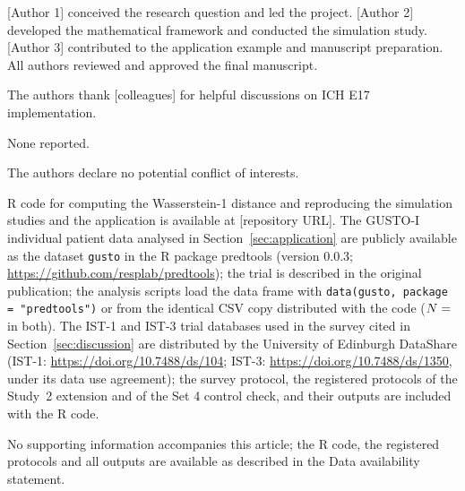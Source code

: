 \documentclass[AMA,Times1COL]{WileyNJDv5}
\begin{document}


[Author 1] conceived the research question and led the project. [Author 2] developed the mathematical framework and conducted the simulation study. [Author 3] contributed to the application example and manuscript preparation. All authors reviewed and approved the final manuscript.


The authors thank [colleagues] for helpful discussions on ICH E17 implementation.


None reported.


The authors declare no potential conflict of interests.


R code for computing the Wasserstein-1 distance and reproducing the simulation studies and the application is available at [repository URL]. The GUSTO-I individual patient data analysed in Section~\ref{sec:application} are publicly available as the dataset \texttt{gusto} in the R package predtools (version 0.0.3; \url{https://github.com/resplab/predtools}); the trial is described in the original publication;\cite{gusto1993} the analysis scripts load the data frame with \texttt{data(gusto, package = "predtools")} or from the identical CSV copy distributed with the code ($N = \numval{gustoN}$ in both). The IST-1 and IST-3 trial databases used in the survey cited in Section~\ref{sec:discussion} are distributed by the University of Edinburgh DataShare (IST-1: \url{https://doi.org/10.7488/ds/104}; IST-3: \url{https://doi.org/10.7488/ds/1350}, under its data use agreement); the survey protocol, the registered protocols of the Study~2 extension and of the Set 4 control check, and their outputs are included with the R code.




No supporting information accompanies this article; the R code, the registered protocols and all outputs are available as described in the Data availability statement.
\end{document}

